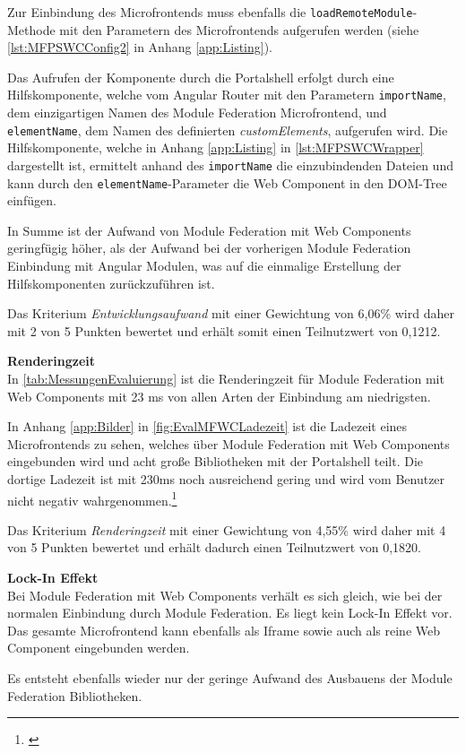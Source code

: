 Zur Einbindung des Microfrontends muss ebenfalls die \texttt{loadRemoteModule}-Methode mit den Parametern des Microfrontends aufgerufen werden (siehe \cref{lst:MFPSWCConfig2} in Anhang \ref{app:Listing}).

Das Aufrufen der Komponente durch die Portalshell erfolgt durch eine Hilfskomponente, welche vom Angular Router mit den Parametern \texttt{importName}, dem einzigartigen Namen des Module Federation Microfrontend, und \texttt{elementName}, dem Namen des definierten \textit{customElements}, aufgerufen wird. Die Hilfskomponente, welche in Anhang \ref{app:Listing} in \cref{lst:MFPSWCWrapper} dargestellt ist, ermittelt anhand des \texttt{importName} die einzubindenden Dateien und kann durch den \texttt{elementName}-Parameter die Web Component in den DOM-Tree einfügen.

In Summe ist der Aufwand von Module Federation mit Web Components geringfügig höher, als der Aufwand bei der vorherigen Module Federation Einbindung mit Angular Modulen, was auf die einmalige Erstellung der Hilfskomponenten zurückzuführen ist.

Das Kriterium \textit{Entwicklungsaufwand} mit einer Gewichtung von 6,06\% wird daher mit 2 von 5 Punkten bewertet und erhält somit einen Teilnutzwert von 0,1212.

\textbf{Renderingzeit}\\
In \cref{tab:MessungenEvaluierung} ist die Renderingzeit für Module Federation mit Web Components mit 23 ms von allen Arten der Einbindung am niedrigsten. 

In Anhang \ref{app:Bilder} in \cref{fig:EvalMFWCLadezeit} ist die Ladezeit eines Microfrontends zu sehen, welches über Module Federation mit Web Components eingebunden wird und acht große Bibliotheken mit der Portalshell teilt. Die dortige Ladezeit ist mit 230ms noch ausreichend gering und wird vom Benutzer nicht negativ wahrgenommen.\footnote{\cite[vgl.][]{unbounce2022}}

Das Kriterium \textit{Renderingzeit} mit einer Gewichtung von 4,55\% wird daher mit 4 von 5 Punkten bewertet und erhält dadurch einen Teilnutzwert von 0,1820.

\textbf{Lock-In Effekt}\\
Bei Module Federation mit Web Components verhält es sich gleich, wie bei der normalen Einbindung durch Module Federation. Es liegt kein Lock-In Effekt vor. Das gesamte Microfrontend kann ebenfalls als Iframe sowie auch als reine Web Component eingebunden werden.

Es entsteht ebenfalls wieder nur der geringe Aufwand des Ausbauens der Module Federation Bibliotheken.

